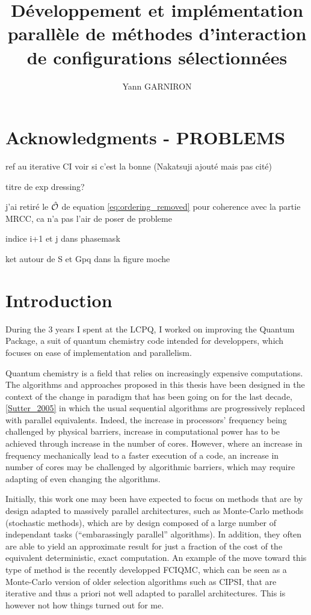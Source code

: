 \documentclass[12pt,a4paper]{report}
\title{Développement et implémentation parallèle de méthodes d'interaction de configurations sélectionnées}
\author{Yann GARNIRON}
\begin{document}
\dominitoc

\makeflyleaf
\newpage

\chapter*{Acknowledgments - PROBLEMS}





ref au iterative CI voir si c'est la bonne (Nakatsuji ajouté mais pas cité)

titre de exp dressing?

j'ai retiré le ${\hat{\mathcal{O}}}$ de equation \ref{eq:ordering_removed} pour coherence avec la partie MRCC, ca n'a pas l'air de poser de probleme

indice i+1 et j dans phasemask

ket autour de S et Gpq dans la figure moche


\newpage

\tableofcontents
\newpage


\chapter{Introduction}

During the 3 years I spent at the LCPQ, I worked on improving the Quantum Package, a suit of quantum chemistry code intended for developpers, which focuses on ease of implementation and parallelism.

Quantum chemistry is a field that relies on increasingly expensive computations. The algorithms and approaches proposed in this thesis have been designed in the context of the change in paradigm that has been going on for the last decade,\ref{Sutter_2005} in which the usual sequential algorithms are progressively replaced with parallel equivalents. Indeed, the increase in processors' frequency being challenged by physical barriers, increase in computational power has to be achieved through increase in the number of cores. However, where an increase in frequency mechanically lead to a faster execution of a code, an increase in number of cores may be challenged by algorithmic barriers, which may require adapting of even changing the algorithms.

Initially, this work one may been have expected to focus on methods that are by design adapted to massively parallel architectures, such as Monte-Carlo methods (stochastic methods), which are by design composed of a large number of independant tasks (``embarassingly parallel'' algorithms). In addition, they often are able to yield an approximate result for just a fraction of the cost of the equivalent deterministic, exact computation. An example of the move toward this type of method is the recently developped FCIQMC, which can be seen as a Monte-Carlo version of older selection algorithms such as CIPSI, that are iterative and thus a priori not well adapted to parallel architectures. This is however not how things turned out for me.
\end{document}
